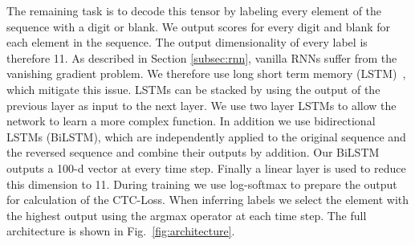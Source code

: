 The remaining task is to decode this tensor by labeling every element of the sequence with a digit or blank.
We output scores for every digit and blank for each element in the sequence.
The output dimensionality of every label is therefore 11.
As described in Section \ref{subsec:rnn}, vanilla RNNs suffer from the vanishing gradient problem.
We therefore use long short term memory (LSTM)~\cite{LSTM}, which mitigate this issue.
LSTMs can be stacked by using the output of the previous layer as input to the next layer.
We use two layer LSTMs to allow the network to learn a more complex function.
In addition we use bidirectional LSTMs (BiLSTM), which are independently applied to the original sequence and the reversed sequence and combine their outputs by addition.
Our BiLSTM outputs a 100-d vector at every time step.
Finally a linear layer is used to reduce this dimension to 11.
During training we use log-softmax to prepare the output for calculation of the CTC-Loss.
When inferring labels we select the element with the highest output using the argmax operator at each time step.
The full architecture is shown in Fig.~\ref{fig:architecture}.

